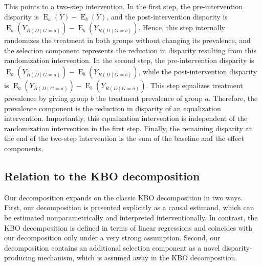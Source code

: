 \documentclass[12pt,a4paper]{article}
\newcommand{\E}{\operatorname{E}}
\begin{document}
This points to a two-step intervention. In the first step, the pre-intervention disparity is $\E_a(Y) - \E_b(Y)$, and the post-intervention disparity is $\E_a \left(Y_{R(D \mid G=a)} \right) - \E_b \left(Y_{R(D \mid G=b)}\right)$. Hence, this step internally randomizes the treatment in both groups without changing its prevalence, and the selection component represents the reduction in disparity resulting from this randomization intervention. In the second step, the pre-intervention disparity is $\E_a \left(Y_{R(D \mid G=a)} \right) - \E_b \left(Y_{R(D \mid G=b)}\right)$, while the post-intervention disparity is $\E_a \left(Y_{R(D \mid G=a)} \right)-\E_b \left(Y_{R(D \mid G=a)} \right)$. This step equalizes treatment prevalence by giving group $b$ the treatment prevalence of group $a$. Therefore, the prevalence component is the reduction in disparity of an equalization intervention. Importantly, this equalization intervention is independent of the randomization intervention in the first step. Finally, the remaining disparity at the end of the two-step intervention is the sum of the baseline and the effect components. 

\subsection{Relation to the KBO decomposition}
Our decomposition expands on the classic KBO decomposition in two ways. First, our decomposition is presented explicitly as a causal estimand, which can be estimated nonparametrically and interpreted interventionally. 
In contrast, the KBO decomposition is defined in terms of linear regressions and coincides with our decomposition only under a very strong assumption. Second, our decomposition contains an additional selection component as a novel disparity-producing mechanism, which is assumed away in the KBO decomposition. 
\end{document}
